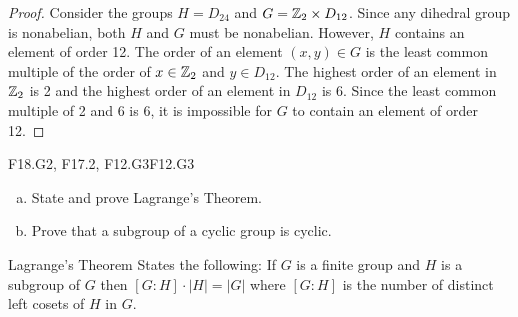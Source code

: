 \documentclass[../AlgebraQualSolutions.tex]{subfiles}
\begin{document}
\begin{proof}
	Consider the groups $H = D_{24}$ and $G = \mathbb{Z}_2 \times D_{12}$. Since any dihedral group is nonabelian, both $H$ and $G$ must be nonabelian. However, $H$ contains an element of order 12. The order of an element $(x,y) \in G$ is the least common multiple of the order of $x \in \mathbb{Z}_2$ and $y \in D_{12}$. The highest order of an element in $\mathbb{Z}_2$ is 2 and the highest order of an element in $D_{12}$ is 6. Since the least common multiple of 2 and 6 is 6, it is impossible for $G$ to contain an element of order 12.
\end{proof}

	\begin{prob}{F18.G2, F17.2, F12.G3}{F12.G3}
	\begin{enumerate}[(a)]
	\item State and prove Lagrange's Theorem.
	\item Prove that a subgroup of a cyclic group is cyclic.
	\end{enumerate}
	\end{prob}
	
	Lagrange's Theorem States the following: If $G$ is a finite group and $H$ is a subgroup of $G$ then $[G:H]\cdot|H| = |G|$ where $[G:H]$ is the number of distinct left cosets of $H$ in $G$.
\end{document}
